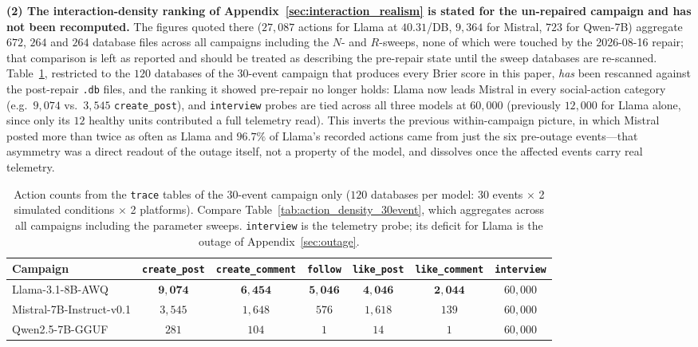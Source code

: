 \documentclass[11pt,journal,onecolumn]{IEEEtran}
\begin{document}
\textbf{(2) The interaction-density ranking of Appendix~\ref{sec:interaction_realism} is stated for the un-repaired campaign and has not been recomputed.} The figures quoted there ($27{,}087$ actions for Llama at $40.31$/DB, $9{,}364$ for Mistral, $723$ for Qwen-7B) aggregate $672$, $264$ and $264$ database files across all campaigns including the $N$- and $R$-sweeps, none of which were touched by the 2026-08-16 repair; that comparison is left as reported and should be treated as describing the pre-repair state until the sweep databases are re-scanned. Table~\ref{tab:action_30event_only}, restricted to the $120$ databases of the 30-event campaign that produces every Brier score in this paper, \emph{has} been rescanned against the post-repair \texttt{.db} files, and the ranking it showed pre-repair no longer holds: Llama now leads Mistral in every social-action category (e.g.\ $9{,}074$ vs.\ $3{,}545$ \texttt{create\_post}), and \texttt{interview} probes are tied across all three models at $60{,}000$ (previously $12{,}000$ for Llama alone, since only its $12$ healthy units contributed a full telemetry read). This inverts the previous within-campaign picture, in which Mistral posted more than twice as often as Llama and $96.7\%$ of Llama's recorded actions came from just the six pre-outage events---that asymmetry was a direct readout of the outage itself, not a property of the model, and dissolves once the affected events carry real telemetry.

\begin{table}[!htbp]
\centering
\caption{Action counts from the \texttt{trace} tables of the 30-event campaign only ($120$ databases per model: 30 events $\times$ 2 simulated conditions $\times$ 2 platforms). Compare Table~\ref{tab:action_density_30event}, which aggregates across all campaigns including the parameter sweeps. \texttt{interview} is the telemetry probe; its deficit for Llama is the outage of Appendix~\ref{sec:outage}.}
\label{tab:action_30event_only}
\small
\begin{tabular}{lcccccc}
\toprule
\textbf{Campaign} & \texttt{create\_post} & \texttt{create\_comment} & \texttt{follow} & \texttt{like\_post} & \texttt{like\_comment} & \texttt{interview} \\
\midrule
Llama-3.1-8B-AWQ         & $\mathbf{9{,}074}$ & $\mathbf{6{,}454}$ & $\mathbf{5{,}046}$ & $\mathbf{4{,}046}$ & $\mathbf{2{,}044}$ & $60{,}000$ \\
Mistral-7B-Instruct-v0.1 & $3{,}545$ & $1{,}648$ & $576$ & $1{,}618$ & $139$ & $60{,}000$ \\
Qwen2.5-7B-GGUF          & $281$ & $104$ & $1$ & $14$ & $1$ & $60{,}000$ \\
\bottomrule
\end{tabular}
\setlength{\tabcolsep}{6pt}
\end{table}
\end{document}
